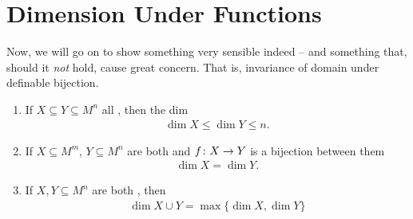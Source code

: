 \section{Dimension Under Functions}

Now, we will go on to show something very sensible indeed -- and something that, should it \emph{not} hold, cause great concern. That is, invariance of domain under definable bijection.

\begin{proposition}
  \begin{enumerate}
    \item \label{prop:defbij_1} If $X \subseteq Y \subseteq M^n$ all , then the dim
      \begin{align*}
        \dim{X} \leq \dim{Y} \leq n.
      \end{align*}
    \item \label{prop:defbij_2} If $X \subseteq M^m$, $Y \subseteq M^n$ are both  and $f \colon X \to Y$ is a  bijection between them
      \begin{align*}
        \dim{X} = \dim{Y}.
      \end{align*}
    \item \label{prop:defbij_3} If $X, Y \subseteq M^n$ are both , then
      \begin{align*}
        \dim{X \cup Y} = \max{\{ \dim{X}, \dim{Y} \}}
      \end{align*}
  \end{enumerate}  
\end{proposition}

